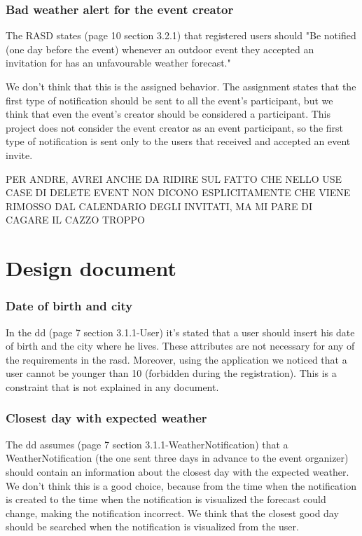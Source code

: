 \documentclass[10pt,a4paper,titlepage]{article}
\begin{document}
\section{Bad weather alert for the event creator}
The RASD states (page 10 section 3.2.1) that registered users should "Be notified (one day before the event) whenever an outdoor event they accepted an invitation for has an unfavourable weather forecast."

We don't think that this is the assigned behavior. The assignment states that the first type of notification should be sent to all the event's participant, but we think that even the event's creator should be considered a participant. This project does not consider the event creator as an event participant, so the first type of notification is sent only to the users that received and accepted an event invite.


PER ANDRE, AVREI ANCHE DA RIDIRE SUL FATTO CHE NELLO USE CASE DI DELETE EVENT NON DICONO ESPLICITAMENTE CHE VIENE RIMOSSO DAL CALENDARIO DEGLI INVITATI, MA MI PARE DI CAGARE IL CAZZO TROPPO

\part{Design document}
\section{Date of birth and city}
In the dd (page 7 section 3.1.1-User) it's stated that a user should insert his date of birth and the city where he lives. These attributes are not necessary for any of the requirements in the rasd. Moreover, using the application we noticed that a user cannot be younger than 10 (forbidden during the registration). This is a constraint that is not explained in any document.

\section{Closest day with expected weather}
The dd assumes (page 7 section 3.1.1-WeatherNotification) that a WeatherNotification (the one sent three days in advance to the event organizer) should contain an information about the closest day with the expected weather.
We don't think this is a good choice, because from the time when the notification is created to the time when the notification is visualized the forecast could change, making the notification incorrect. We think that the closest good day should be searched when the notification is visualized from the user.
\end{document}
